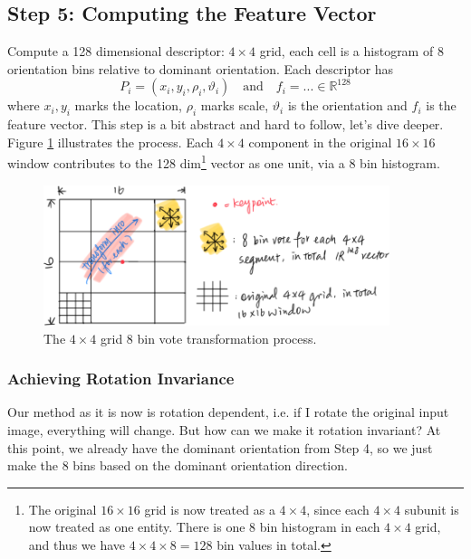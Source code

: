 \documentclass[11pt]{article}
\newcommand{\real}{\mathbb{R}}
\begin{document}
\subsection{Step 5: Computing the Feature Vector}
Compute a 128 dimensional descriptor: $4 \times 4$ grid, each cell is a histogram of 8 orientation bins relative to dominant orientation. Each descriptor has 
\begin{equation}
	P_i = (x_i, y_i, \rho_i, \vartheta_i ) \quad\text{and} \quad f_i = ... \in \real^{128}
\end{equation}
where $x_i, y_i$ marks the location, $\rho_i$ marks scale, $\vartheta_i$ is the orientation and $f_i$ is the feature vector. This step is a bit abstract and hard to follow, let's dive deeper. Figure \ref{fig:compute feature vector SIFT} illustrates the process. Each $4 \times 4$ component in the original $16 \times 16$ window contributes to the 128 dim\footnote{The original $16 \times 16$ grid is now treated as a $4 \times 4$, since each $4 \times 4$ subunit is now treated as one entity. There is one 8 bin histogram in each $4 \times 4$ grid, and thus we have $4 \times 4 \times 8 = 128$ bin values in total. } vector as one unit, via a 8 bin histogram. 
\begin{figure}[H]
	\center\includegraphics[width=0.9\textwidth]{figs/compute_feature_vector_SIFT}
	\caption{The $4 \times 4$ grid 8 bin vote transformation process. \label{fig:compute feature vector SIFT}}
\end{figure}

\subsubsection{Achieving Rotation Invariance} Our method as it is now is rotation dependent, i.e. if I rotate the original input image, everything will change. But how can we make it rotation invariant? At this point, we already have the dominant orientation from Step 4, so we just make the 8 bins based on the dominant orientation direction. 
\end{document}
